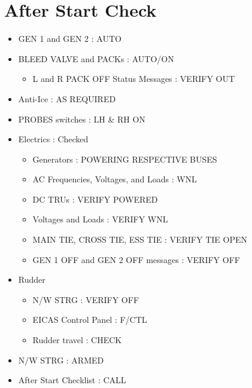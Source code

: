 \section{After Start Check}
\label{afterstartcheck}

\begin{itemize}
\item GEN 1 and GEN 2 : AUTO

\item BLEED VALVE and PACKs : AUTO\slash ON

\begin{itemize}
\item L and R PACK OFF Status Messages : VERIFY OUT

\end{itemize}

\item Anti-Ice : AS REQUIRED

\item PROBES switches : LH \& RH ON

\item Electrics : Checked

\begin{itemize}
\item Generators : POWERING RESPECTIVE BUSES

\item AC Frequencies, Voltages, and Loads : WNL

\item DC TRUs : VERIFY POWERED

\item Voltages and Loads : VERIFY WNL

\item MAIN TIE, CROSS TIE, ESS TIE : VERIFY TIE OPEN

\item GEN 1 OFF and GEN 2 OFF messages : VERIFY OFF

\end{itemize}

\item Rudder

\begin{itemize}
\item N\slash W STRG : VERIFY OFF

\item EICAS Control Panel : F\slash CTL

\item Rudder travel : CHECK

\end{itemize}

\item N\slash W STRG : ARMED

\item After Start Checklist : CALL

\end{itemize}

